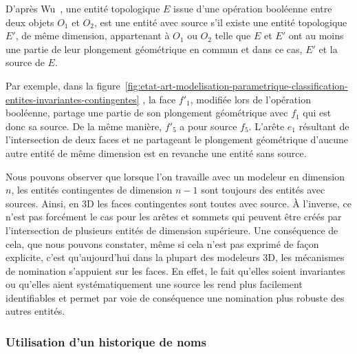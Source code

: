 D'après Wu~\cite{wu2001face}, une entité topologique $E$ issue d'une opération
booléenne entre deux objets $O_{1}$ et $O_{2}$, est une entité avec source s'il
existe une entité topologique $E'$, de même dimension, appartenant à $O_{1}$ ou
$O_{2}$ telle que $E$ et $E'$ ont au moins une partie de leur plongement
géométrique en commun et dans ce cas, $E'$ et la source de $E$. %
%

Par exemple, dans la
figure~\ref{fig:etat-art-modelisation-parametrique-classification-entites-invariantes-contingentes}
, la face $f'_{1}$, modifiée lors de l'opération booléenne, partage une partie
de son plongement géométrique avec $f_{1}$ qui est donc sa source. %
De la même manière, $f'_{5}$ a pour source $f_{5}$. %
L'arête $e_1$ résultant de l'intersection de deux faces et ne partageant le
plongement géométrique d'aucune autre entité de même dimension est en revanche
une entité sans source. %

Nous pouvons observer que lorsque l'on travaille avec un modeleur en dimension
$n$, les entités contingentes de dimension $n-1$ sont toujours des entités avec sources. %
Ainsi, en 3D les faces contingentes sont toutes avec source. %
À l'inverse, ce n'est pas forcément le cas pour les arêtes et sommets qui
peuvent être créés par l'intersection de plusieurs entités de dimension
supérieure. %
Une conséquence de cela, que nous pouvons constater, même si cela n'est pas exprimé de façon explicite, c'est qu'aujourd'hui dans la plupart des modeleurs 3D, les mécanismes de nomination s'appuient sur les faces. %
En effet, le fait qu'elles soient invariantes ou qu'elles aient systématiquement une source les rend plus facilement identifiables et permet par voie de conséquence une nomination plus robuste des autres entités. %

\subsubsection*{Utilisation d'un historique de noms}

